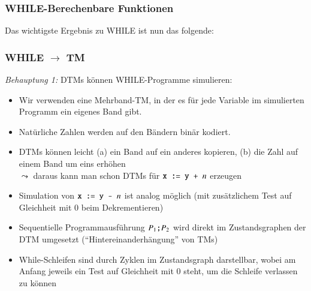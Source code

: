 \documentclass[aspectratio=1610,onlymath]{beamer}
\begin{document}
\begin{frame}\frametitle{WHILE-Berechenbare Funktionen}

\bigskip\pause

Das wichtigste Ergebnis zu WHILE ist nun das folgende:


\end{frame}

\begin{frame}\frametitle{WHILE $\to$ TM}

\emph{Behauptung 1:} DTMs können WHILE-Programme simulieren:\pause
\medskip

\begin{itemize}
\item Wir verwenden eine Mehrband-TM, in der es für jede Variable im simulierten Programm ein eigenes Band gibt.\pause
\item Natürliche Zahlen werden auf den Bändern binär kodiert.\pause
\item DTMs können leicht (a) ein Band auf ein anderes kopieren, (b) die Zahl auf einem Band um eins erhöhen \\$\leadsto$ daraus kann man schon DTMs für $\texttt{x}\texttt{ := }\texttt{y}\texttt{ + } n$ erzeugen\pause
\item Simulation von $\texttt{x}\texttt{ := }\texttt{y}\texttt{ - } n$ ist analog möglich (mit zusätzlichem Test auf Gleichheit mit $0$ beim Dekrementieren)\pause
\item Sequentielle Programmausführung $P_1\texttt{;} P_2$ wird direkt im Zustandsgraphen der DTM umgesetzt ("`Hintereinanderhängung"' von TMs)\pause
\item While-Schleifen sind durch Zyklen im Zustandsgraph darstellbar, wobei am Anfang jeweils ein Test auf Gleichheit mit $0$ steht, um die Schleife verlassen zu können
\end{itemize}


\end{frame}
\end{document}
